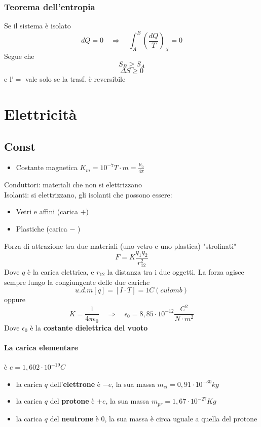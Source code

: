 \documentclass[a4paper]{report}
\begin{document}
  \subsection{Teorema dell'entropia}
  Se il sistema è isolato
  \[ dQ = 0 \quad \Rightarrow \quad \int_A^B(\frac{dQ}{T})_X = 0\]
  Segue che
  \[ S_B \geq S_A \]
  \[ \Delta S \geq 0 \]
  e l'$=$ vale solo se la trasf. è reversibile

  \chapter{Elettricità}
  \section{Const}
  \begin{itemize}
    \item Costante magnetica $K_m = 10^{-7} T\cdot m = \frac{\mu_0}{4\pi}$
  \end{itemize}


  Conduttori: materiali che non si elettrizzano \\
  Isolanti: si elettrizzano, gli isolanti che possono essere:
  \begin{itemize}
    \item Vetri e affini (carica $+$)
    \item Plastiche (carica $-$ )
  \end{itemize}
  Forza di attrazione tra due materiali (uno vetro e uno plastica) "strofinati"
  \[ F = K\frac{q_1 q_2}{r_{12}^2} \]
  Dove $q$ è la carica elettrica, e $r_{12}$ la distanza tra i due oggetti. La forza agisce sempre lungo la congiungente delle due cariche
  \[u.d.m[q] = [I\cdot T] = 1C (culomb)\]
  oppure
  \[ K = \frac{1}{4 \pi \epsilon_0} \quad \Rightarrow \quad \epsilon_0 = 8,85\cdot 10^{-12} \frac{C^2}{N\cdot m^2}\]
  Dove $\epsilon_0$ è la \textbf{costante dielettrica del vuoto}
  \subsubsection{La carica elementare}
  è $e = 1,602 \cdot 10^{-19} C$
  \begin{itemize}
    \item la carica $q$ dell'\textbf{elettrone} è $-e$, la sua massa $m_{el} = 0,91 \cdot 10^{-30} kg$
    \item la carica $q$ del \textbf{protone} è $+e$, la sua massa $m_{pr} = 1,67 \cdot 10^{-27} Kg$
    \item la carica $q$ del \textbf{neutrone} è $0$, la sua massa è circa uguale a quella del protone
  \end{itemize}
\end{document}
